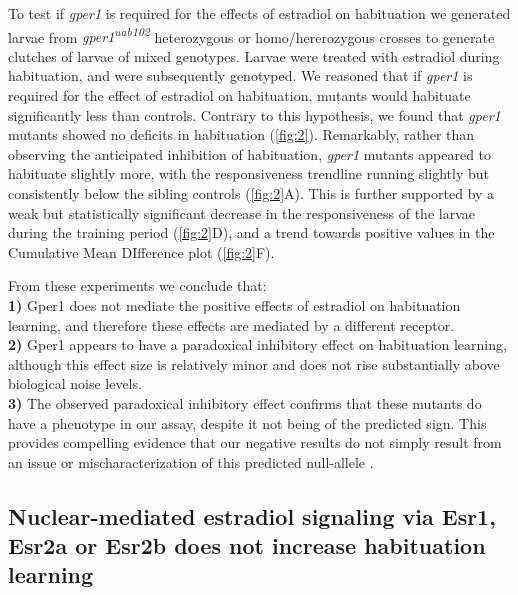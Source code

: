 \documentclass[9pt,lineno]{RandlettLab_elife}
\begin{document}
{To test if \emph{gper1} is required for the effects of estradiol on habituation we generated larvae from \emph{gper1\textsuperscript{uab102}} heterozygous or homo/hererozygous crosses to generate clutches of larvae of mixed genotypes. Larvae were treated with estradiol during habituation, and were subsequently genotyped. We reasoned that if \emph{gper1} is required for the effect of estradiol on habituation, mutants would habituate significantly less than controls. Contrary to this hypothesis, we found that \emph{gper1} mutants showed no deficits in habituation (\autoref{fig:2}). Remarkably, rather than observing the anticipated inhibition of habituation, \emph{gper1} mutants appeared to habituate slightly more, with the responsiveness trendline running slightly but consistently below the sibling controls (\autoref{fig:2}A). This is further supported by a weak but statistically significant decrease in the responsiveness of the larvae during the training period (\autoref{fig:2}D), and a trend towards positive values in the Cumulative Mean DIfference plot (\autoref{fig:2}F). 

From these experiments we conclude that: 
\\ \textbf{1)} Gper1 does not mediate the positive effects of estradiol on habituation learning, and therefore these effects are mediated by a different receptor. 
\\ \textbf{2)} Gper1 appears to have a paradoxical inhibitory effect on habituation learning, although this effect size is relatively minor and does not rise substantially above biological noise levels. 
\\ \textbf{3)} The observed paradoxical inhibitory effect confirms that these mutants do have a phenotype in our assay, despite it not being of the predicted sign. This provides compelling evidence that our negative results do not simply result from an issue or mischaracterization of this predicted null-allele \citep{Romano2017-ep}.  

\subsection{Nuclear-mediated estradiol signaling via Esr1, Esr2a or Esr2b does not increase habituation learning}

}
\end{document}
